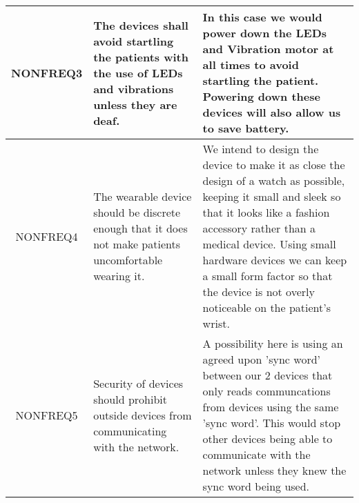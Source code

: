 \begin{xltabular}[H]{\textwidth}{c | X | X}
        \midrule

        NONFREQ3

        &

        The devices shall avoid startling the patients with the use of LEDs and vibrations unless they are deaf.

        &

        In this case we would power down the LEDs and Vibration motor at all times to avoid startling the patient. Powering down these devices will also allow us to save battery.\\

        \midrule

        NONFREQ4

        &

        The wearable device should be discrete enough that it does not make patients uncomfortable wearing it.

        &

        We intend to design the device to make it as close the design of a watch as possible, keeping it small and sleek so that it looks like a fashion accessory rather than a medical device. Using small hardware devices we can keep a small form factor so that the device is not overly noticeable on the patient's wrist.\\

        \midrule

        NONFREQ5

        &

        Security of devices should prohibit outside devices from communicating with the network.

        &

        A possibility here is using an agreed upon 'sync word' between our 2 devices that only reads communcations from devices using the same 'sync word'. This would stop other devices being able to communicate with the network unless they knew the sync word being used.\\

	\end{xltabular}
	\label{tbl:non_func_reqs_table}
